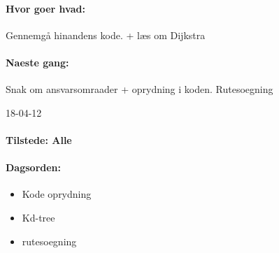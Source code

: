 \documentclass[a4paper,10pt,titlepage]{article}
\begin{document}
		\paragraph{Hvor goer hvad:}
		Gennemgå hinandens kode. + læs om Dijkstra 
		
		\paragraph{Naeste gang:}
		Snak om ansvarsomraader + oprydning i koden.
		Rutesoegning\mbox{}\\
		
		\begin{center}
		18-04-12
		\end{center}
		
		\paragraph{Tilstede: Alle}
		\paragraph{Dagsorden:}
		\begin{itemize}
					\item Kode oprydning
					\item Kd-tree
					\item rutesoegning
		\end{itemize}
		
\end{document}
